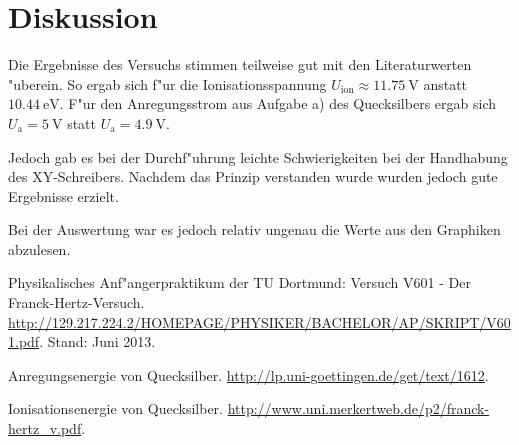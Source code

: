 \section{Diskussion}
\label{sec:diskussion}

Die Ergebnisse des Versuchs stimmen teilweise gut mit den Literaturwerten "uberein.
So ergab sich f"ur die Ionisationsspannung $U_\mathrm{ion} \approx \SI{11.75}{\volt}$ anstatt $\SI{10.44}{\electronvolt}$. F"ur den Anregungsstrom aus Aufgabe a) des Quecksilbers ergab sich $U_\mathrm{a} = \SI{5}{\volt}$ statt $U_\mathrm{a} = \SI{4.9}{\volt}$.

Jedoch gab es bei der Durchf"uhrung leichte Schwierigkeiten bei der Handhabung des XY-Schreibers. Nachdem das Prinzip verstanden wurde wurden jedoch gute Ergebnisse erzielt.

Bei der Auswertung war es jedoch relativ ungenau die Werte aus den Graphiken abzulesen. 


\begin{thebibliography}{9}
	 Physikalisches Anf"angerpraktikum der TU Dortmund: Versuch V601 - Der Franck-Hertz-Versuch. \url{http://129.217.224.2/HOMEPAGE/PHYSIKER/BACHELOR/AP/SKRIPT/V601.pdf}. Stand: Juni 2013.

	 Anregungsenergie von Quecksilber. \url{http://lp.uni-goettingen.de/get/text/1612}.

	 Ionisationsenergie von Quecksilber. \url{http://www.uni.merkertweb.de/p2/franck-hertz_v.pdf}.
\end{thebibliography}

